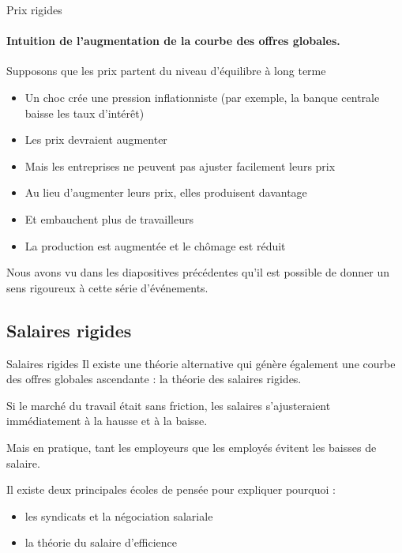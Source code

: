 \documentclass[
  ignorenonframetext,
  aspectratio=169,
]{beamer}
\providecommand{\tightlist}{%
  \setlength{\itemsep}{0pt}\setlength{\parskip}{0pt}}\usepackage{longtable,booktabs,array}
\begin{document}
\begin{frame}{Prix rigides}
\label{prix-rigides-3}
\framesubtitle{Intuition de l'augmentation de la courbe des offres globales.}

Supposons que les prix partent du niveau d'équilibre à long terme

\begin{itemize}
\tightlist
\item
  Un choc crée une pression inflationniste (par exemple, la banque
  centrale baisse les taux d'intérêt)
\item
  Les prix devraient augmenter
\item
  Mais les entreprises ne peuvent pas ajuster facilement leurs prix
\item
  Au lieu d'augmenter leurs prix, elles produisent davantage
\item
  Et embauchent plus de travailleurs
\item
  La production est augmentée et le chômage est réduit
\end{itemize}

Nous avons vu dans les diapositives précédentes qu'il est possible de
donner un sens rigoureux à cette série d'événements.
\end{frame}

\subsection{Salaires rigides}\label{salaires-rigides}

\begin{frame}{Salaires rigides}
\label{salaires-rigides-1}
Il existe une théorie alternative qui génère également une courbe des
offres globales ascendante : la théorie des salaires rigides.

Si le marché du travail était sans friction, les salaires s'ajusteraient
immédiatement à la hausse et à la baisse.

Mais en pratique, tant les employeurs que les employés évitent les
baisses de salaire.

Il existe deux principales écoles de pensée pour expliquer pourquoi :

\begin{itemize}
\tightlist
\item
  les syndicats et la négociation salariale
\item
  la théorie du salaire d'efficience
\end{itemize}
\end{frame}
\end{document}

